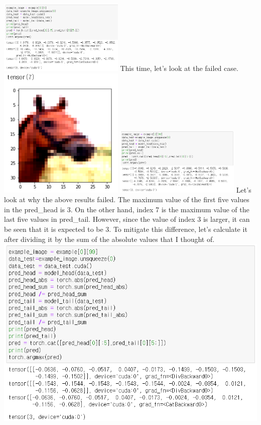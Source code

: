 \documentclass[extendedabs]{bmvc2k}
\begin{document}
  \newline \includegraphics[width=6cm]{images/19_project.PNG}
  \newline This time, let's look at the failed case.
  \newline \includegraphics[width=6cm]{images/20_project.PNG}
  \newline \includegraphics[width=6cm]{images/21_project.PNG}
  \newline Let's look at why the above results failed. The maximum value of the first five values in the pred\_head is 3. 
  On the other hand, index 7 is the maximum value of the last five values in pred\_tail. 
  However, since the value of index 3 is larger, it can be seen that it is expected to be 3.
  To mitigate this difference, let's calculate it after dividing it by the sum of the absolute values that I thought of.
  \newline \includegraphics[width=\linewidth]{images/22_project.PNG}
\end{document}
